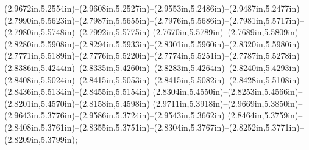 (2.9672in,5.2554in)--(2.9608in,5.2527in)--(2.9553in,5.2486in)--(2.9487in,5.2477in) (2.7990in,5.5623in)--(2.7987in,5.5655in)--(2.7976in,5.5686in)--(2.7981in,5.5717in)--(2.7980in,5.5748in)--(2.7992in,5.5775in) (2.7670in,5.5789in)--(2.7689in,5.5809in) (2.8280in,5.5908in)--(2.8294in,5.5933in)--(2.8301in,5.5960in)--(2.8320in,5.5980in) (2.7771in,5.5189in)--(2.7776in,5.5220in)--(2.7774in,5.5251in)--(2.7787in,5.5278in) (2.8386in,5.4244in)--(2.8335in,5.4260in)--(2.8283in,5.4264in)--(2.8240in,5.4293in) (2.8408in,5.5024in)--(2.8415in,5.5053in)--(2.8415in,5.5082in)--(2.8428in,5.5108in)--(2.8436in,5.5134in)--(2.8455in,5.5154in) (2.8304in,5.4550in)--(2.8253in,5.4566in)--(2.8201in,5.4570in)--(2.8158in,5.4598in) (2.9711in,5.3918in)--(2.9669in,5.3850in)--(2.9643in,5.3776in)--(2.9586in,5.3724in)--(2.9543in,5.3662in) (2.8464in,5.3759in)--(2.8408in,5.3761in)--(2.8355in,5.3751in)--(2.8304in,5.3767in)--(2.8252in,5.3771in)--(2.8209in,5.3799in);
